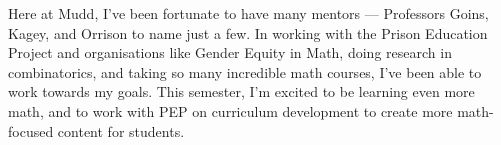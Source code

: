 \documentclass[12 pt, letterpaper]{hmcpset}
\begin{document}
\begin{solution}
	Here at Mudd, I've been fortunate to have many mentors --- Professors Goins, Kagey, and Orrison to name just a few. In working with the Prison Education Project and organisations like Gender Equity in Math, doing research in combinatorics, and taking so many incredible math courses, I've been able to work towards my goals. This semester, I'm excited to be learning even more math, and to work with PEP on curriculum development to create more math-focused content for students.
\end{solution}
\end{document}
